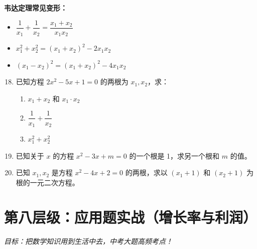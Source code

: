 \documentclass[12pt, a4paper]{article}
\begin{document}
\begin{tipbox}
    \textbf{韦达定理常见变形：}
    \begin{itemize}
        \item $\dfrac{1}{x_1} + \dfrac{1}{x_2} = \dfrac{x_1 + x_2}{x_1 x_2}$
        \item $x_1^2 + x_2^2 = (x_1 + x_2)^2 - 2x_1 x_2$
        \item $(x_1 - x_2)^2 = (x_1 + x_2)^2 - 4x_1 x_2$
    \end{itemize}
\end{tipbox}

\begin{examplebox}
    \begin{enumerate}[label=\textbf{例\arabic*.}]
        \setcounter{enumi}{17}
        \item 已知方程 $2x^2 - 5x + 1 = 0$ 的两根为 $x_1, x_2$，求：
        \begin{enumerate}
            \item[(1)] $x_1 + x_2$ 和 $x_1 \cdot x_2$
            \item[(2)] $\dfrac{1}{x_1} + \dfrac{1}{x_2}$
            \item[(3)] $x_1^2 + x_2^2$
        \end{enumerate}
        
        \item 已知关于 $x$ 的方程 $x^2 - 3x + m = 0$ 的一个根是 1，求另一个根和 $m$ 的值。
        
        \item 已知 $x_1, x_2$ 是方程 $x^2 - 4x + 2 = 0$ 的两根，求以 $(x_1+1)$ 和 $(x_2+1)$ 为根的一元二次方程。
    \end{enumerate}
\end{examplebox}

\begin{answerblank}[第18-20题]
    \vspace{7cm}
\end{answerblank}

\newpage

\section{第八层级：应用题实战（增长率与利润）}
\textit{目标：把数学知识用到生活中去，中考大题高频考点！}
\end{document}
